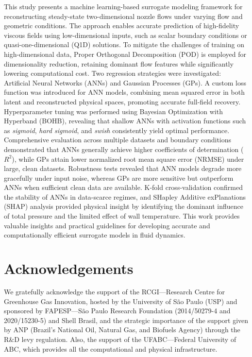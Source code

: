 \documentclass[dscexam, EN]{ufabcFHZh}
\begin{document}
This study presents a machine learning-based surrogate modeling framework for reconstructing steady-state two-dimensional nozzle flows under varying flow and geometric conditions. The approach enables accurate prediction of high-fidelity viscous fields using low-dimensional inputs, such as scalar boundary conditions or quasi-one-dimensional (Q1D) solutions. To mitigate the challenges of training on high-dimensional data, Proper Orthogonal Decomposition (POD) is employed for dimensionality reduction, retaining dominant flow features while significantly lowering computational cost. Two regression strategies were investigated: Artificial Neural Networks (ANNs) and Gaussian Processes (GPs). A custom loss function was introduced for ANN models, combining mean squared error in both latent and reconstructed physical spaces, promoting accurate full-field recovery. Hyperparameter tuning was performed using Bayesian Optimization with Hyperband (BOHB), revealing that shallow ANNs with activation functions such as \textit{sigmoid}, \textit{hard sigmoid}, and \textit{swish} consistently yield optimal performance. Comprehensive evaluation across multiple datasets and boundary conditions demonstrated that ANNs generally achieve higher coefficients of determination ($R^2$), while GPs attain lower normalized root mean square error (NRMSE) under large, clean datasets. Robustness tests revealed that ANN models degrade more gracefully under input noise, whereas GPs are more sensitive but outperform ANNs when sufficient clean data are available. K-fold cross-validation confirmed the stability of ANNs in data-scarce regimes, and SHapley Additive exPlanations (SHAP) analysis provided physical insight by identifying the dominant influence of total pressure and the limited effect of wall temperature. This work provides valuable insights and practical guidelines for developing accurate and computationally efficient surrogate models in fluid dynamics.


\chapter*{Acknowledgements}

We gratefully acknowledge the support of the RCGI—Research Centre for Greenhouse Gas Innovation, hosted by the University of São Paulo (USP) and sponsored by FAPESP—São Paulo Research Foundation (2014/50279-4 and 2020/15230-5) and Shell Brasil, and the strategic importance of the support given by ANP (Brazil's National Oil, Natural Gas, and Biofuels Agency) through the R\&D levy regulation. Also, the support of the UFABC—Federal University of ABC, which provides all the computational and physical infrastructure.
\end{document}
